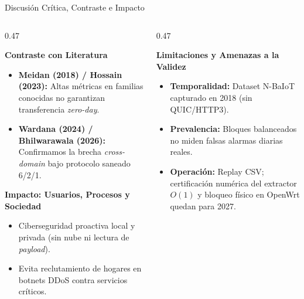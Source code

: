 \documentclass[aspectratio=169, 10pt]{beamer}
\begin{document}
\begin{frame}{Discusión Crítica, Contraste e Impacto}
  \begin{columns}[T]
    \begin{column}{0.47\textwidth}
      \begin{block}{\textbf{Contraste con Literatura}}
        \footnotesize
        \begin{itemize}
          \item \textbf{Meidan (2018) / Hossain (2023):} Altas métricas en familias conocidas no garantizan transferencia \textit{zero-day}.
          \item \textbf{Wardana (2024) / Bhilwarawala (2026):} Confirmamos la brecha \textit{cross-domain} bajo protocolo saneado 6/2/1.
        \end{itemize}
      \end{block}
      \vspace{1.5mm}
      \begin{exampleblock}{\textbf{Impacto: Usuarios, Procesos y Sociedad}}
        \footnotesize
        \begin{itemize}
          \item Ciberseguridad proactiva local y privada (sin nube ni lectura de \textit{payload}).
          \item Evita reclutamiento de hogares en botnets DDoS contra servicios críticos.
        \end{itemize}
      \end{exampleblock}
    \end{column}
    \begin{column}{0.47\textwidth}
      \begin{alertblock}{\textbf{Limitaciones y Amenazas a la Validez}}
        \footnotesize
        \begin{itemize}
          \item \textbf{Temporalidad:} Dataset N-BaIoT capturado en 2018 (sin QUIC/HTTP3).
          \item \textbf{Prevalencia:} Bloques balanceados no miden falsas alarmas diarias reales.
          \item \textbf{Operación:} Replay CSV; certificación numérica del extractor $O(1)$ y bloqueo físico en OpenWrt quedan para 2027.
        \end{itemize}
      \end{alertblock}
    \end{column}
  \end{columns}
\end{frame}
\end{document}
